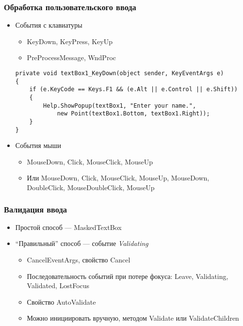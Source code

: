\documentclass{../../slides-style}
\begin{document}
    \begin{frame}[fragile]
        \frametitle{Обработка пользовательского ввода}
        \begin{itemize}
            \item События с клавиатуры
            \begin{itemize}
                \item KeyDown, KeyPress, KeyUp
                \item PreProcessMessage, WndProc
            \end{itemize}
            \begin{scriptsize}
                \begin{verbatim}
private void textBox1_KeyDown(object sender, KeyEventArgs e)
{
    if (e.KeyCode == Keys.F1 && (e.Alt || e.Control || e.Shift))
    {
        Help.ShowPopup(textBox1, "Enter your name.", 
            new Point(textBox1.Bottom, textBox1.Right));
    }
}
                \end{verbatim}
            \end{scriptsize}
            \item События мыши
            \begin{itemize}
                \item MouseDown, Click, MouseClick, MouseUp
                \item Или MouseDown, Click, MouseClick, MouseUp, MouseDown, DoubleClick, MouseDoubleClick, MouseUp
            \end{itemize}
        \end{itemize}
    \end{frame}

    \begin{frame}
        \frametitle{Валидация ввода}
        \begin{itemize}
            \item Простой способ --- MaskedTextBox
            \item ``Правильный'' способ --- событие \textit{Validating}
            \begin{itemize}
                \item CancelEventArgs, свойство Cancel
                \item Последовательность событий при потере фокуса: Leave, Validating, Validated, LostFocus
                \item Свойство AutoValidate
                \item Можно инициировать вручную, методом Validate или ValidateChildren
            \end{itemize}
        \end{itemize}
    \end{frame}
\end{document}
